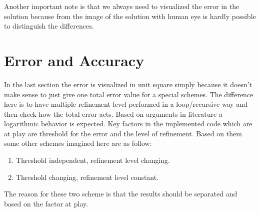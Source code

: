 
Another important note is that we always need to visualized the error in the solution because from the image of the solution with human eye is hardly possible to distinguish the differences.

\section{Error and Accuracy}
In the last section the error is visualized in unit square simply because it doesn't make sense to just give one total error value for a special schemes. The difference here is to have multiple refinement level performed in a loop/recursive way and then check how the total error acts. Based on arguments in literature a logarithmic behavior is expected. Key factors in the implemented code which are at play are threshold for the error and the level of refinement. Based on them some other schemes imagined here are as follow:
\begin{enumerate}
\item Threshold independent, refinement level changing.
\item Threshold changing, refinement level constant.
\end{enumerate}
The reason for these two scheme is that the results should be separated and based on the factor at play.


